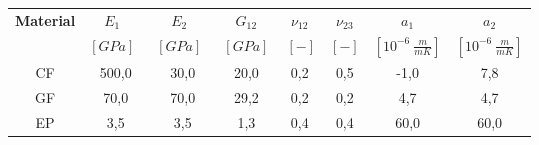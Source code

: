 \begin{table}[htbp]
\footnotesize
  \centering
    \begin{tabularx}{\textwidth}{cccccccc}
    \toprule
    \textbf{Material} & \textbf{$E_{1}$}\ & \textbf{$E_{2}$}\ & \textbf{$G_{12}$} & \textbf{$\nu_{12}$} & \textbf{$\nu_{23}$} & \textbf{$a_{1}$} & \textbf{$a_{2}$} \\
   & \textbf{$\left[GPa\right]$}\ & \textbf{$\left[GPa\right]$}\ & \textbf{$\left[GPa\right]$} & \textbf{$\ \left[-\right]$} & \textbf{$\left[-\right]$} & \textbf{$\left[10^{-6}\  \frac{m}{mK}\right]$} & \textbf{$\left[10^{-6}\  \frac{m}{mK}\right]$} \\
    \midrule
    CF    & 500,0 & 30,0  & 20,0  & 0,2   & 0,5   & -1,0  & 7,8 \\
    GF    & 70,0  & 70,0  & 29,2  & 0,2   & 0,2   & 4,7   & 4,7 \\
    EP    & 3,5   & 3,5   & 1,3   & 0,4   & 0,4   & 60,0  & 60,0 \\
    \bottomrule
    \end{tabularx}%
  \label{tab:phaseprop}%
\end{table}%
